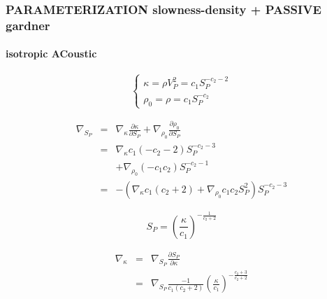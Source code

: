 \documentclass[9pt]{beamer}
\newcommand{\partderi}[2]{\frac{\partial#1}{\partial#2}}
\begin{document}
\begin{frame}\frametitle{PARAMETERIZATION slowness-density + PASSIVE gardner}
\framesubtitle{isotropic ACoustic}

  \begin{center}
  \end{center}

  \begin{minipage}{0.5\linewidth}
    \[\left\{ \begin{array}{l}
      \kappa = \rho V_P^2 = c_1 S_P^{-c_2-2} \\
      \rho_0 = \rho = c_1 S_P ^{-c_2}
    \end{array} \right.\]
    
    \begin{eqnarray}
      \nabla_{S_P} &=& \nabla_{\kappa} \partderi{\kappa}{S_P} + \nabla_{\rho_0} \partderi{\rho_0}{S_P} \nonumber\\
                   &=& \nabla_{\kappa} c_1(-c_2-2) S_P^{-c_2-3} \nonumber\\
                   & &+\nabla_{\rho_0} (-c_1c_2) S_P^{-c_2-1} \nonumber\\
                   &=&-\left( \nabla_{\kappa} c_1(c_2+2) + \nabla_{\rho_0} c_1c_2S_P^2 \right) S_P^{-c_2-3} \nonumber
    \end{eqnarray}

  \end{minipage} \vline
  \begin{minipage}{0.45\linewidth}
    \[ S_P = \left(\frac{\kappa}{c_1}\right)^{-\frac{1}{c_2+2}} \]
    
    \begin{eqnarray}
      \nabla_{\kappa} &=& \nabla_{S_P} \partderi{S_P}{\kappa} \nonumber\\
                      &=& \nabla_{S_P} \frac{-1}{c_1(c_2+2)} \left(\frac{\kappa}{c_1}\right)^{-\frac{c_2+3}{c_2+2}} \nonumber
    \end{eqnarray}
  \end{minipage}

\end{frame}
\end{document}
